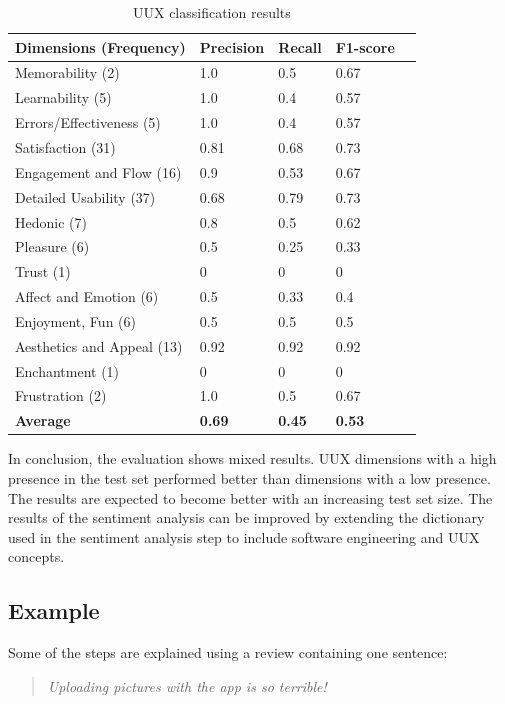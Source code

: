 \begin{table} [t]
    \centering
    \begin{small}
    \caption{UUX classification results \cite[Table II]{Bakiu2017}}
    \label{tab:uux_classification_results}
    \setlength{\tabcolsep}{1em}
    \begin{tabular}{|l|l|l|l|l|}
    \hline
    \textbf{Dimensions (Frequency)} & \textbf{Precision} & \textbf{Recall} & \textbf{F1-score}\\
    \hline
    Memorability (2) & 1.0 & 0.5 & 0.67\\
    Learnability (5) & 1.0 & 0.4 & 0.57\\
    Errors/Effectiveness (5) & 1.0 & 0.4 & 0.57\\
    Satisfaction (31) & 0.81 & 0.68 & 0.73\\
    Engagement and Flow (16) & 0.9 & 0.53 & 0.67\\
    Detailed Usability (37) & 0.68 & 0.79 & 0.73\\
    Hedonic (7) & 0.8 & 0.5 & 0.62\\
    Pleasure (6) & 0.5 & 0.25 & 0.33\\
    Trust (1) & 0 & 0 & 0\\
    Affect and Emotion (6) & 0.5 & 0.33 & 0.4\\
    Enjoyment, Fun (6) & 0.5 & 0.5 & 0.5\\
    Aesthetics and Appeal (13) & 0.92 & 0.92 & 0.92\\
    Enchantment (1) & 0 & 0 & 0\\
    Frustration (2) & 1.0 & 0.5 & 0.67\\
    \hline
    \textbf{Average} & \textbf{0.69} & \textbf{0.45} & \textbf{0.53}\\
    \hline
    \end{tabular}
    \end{small}
\end{table}

In conclusion, the evaluation shows mixed results. UUX dimensions with a high presence in the test set performed better than dimensions with a low presence. The results are expected to become better with an increasing test set size. The results of the sentiment analysis can be improved by extending the dictionary used in the sentiment analysis step to include software engineering and UUX concepts.

\subsection{Example}
Some of the steps are explained using a review containing one sentence:
\begin{quote}
    \textit{Uploading pictures with the app is so terrible!}
\end{quote}


